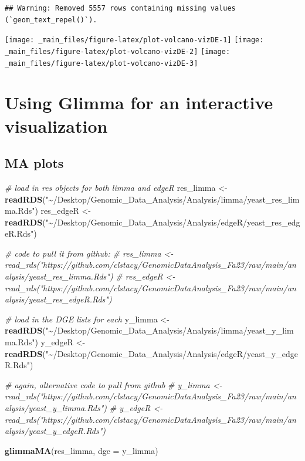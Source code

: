 \documentclass[
]{book}
\newenvironment{Shaded}{\begin{snugshade}}{\end{snugshade}}
\newcommand{\AttributeTok}[1]{\textcolor[rgb]{0.13,0.29,0.53}{#1}}
\newcommand{\CommentTok}[1]{\textcolor[rgb]{0.56,0.35,0.01}{\textit{#1}}}
\newcommand{\FunctionTok}[1]{\textcolor[rgb]{0.13,0.29,0.53}{\textbf{#1}}}
\newcommand{\NormalTok}[1]{#1}
\newcommand{\OtherTok}[1]{\textcolor[rgb]{0.56,0.35,0.01}{#1}}
\newcommand{\StringTok}[1]{\textcolor[rgb]{0.31,0.60,0.02}{#1}}
\begin{document}
\begin{verbatim}
## Warning: Removed 5557 rows containing missing values (`geom_text_repel()`).
\end{verbatim}

\texttt{[image: \_main\_files/figure-latex/plot-volcano-vizDE-1]} \texttt{[image: \_main\_files/figure-latex/plot-volcano-vizDE-2]} \texttt{[image: \_main\_files/figure-latex/plot-volcano-vizDE-3]}

\hypertarget{using-glimma-for-an-interactive-visualization}{%
\section{Using Glimma for an interactive visualization}\label{using-glimma-for-an-interactive-visualization}}

\hypertarget{ma-plots}{%
\subsection{MA plots}\label{ma-plots}}

\begin{Shaded}
\begin{Highlighting}[]
\CommentTok{\# load in res objects for both limma and edgeR}
\NormalTok{res\_limma }\OtherTok{\textless{}{-}} \FunctionTok{readRDS}\NormalTok{(}\StringTok{"\textasciitilde{}/Desktop/Genomic\_Data\_Analysis/Analysis/limma/yeast\_res\_limma.Rds"}\NormalTok{)}
\NormalTok{res\_edgeR }\OtherTok{\textless{}{-}} \FunctionTok{readRDS}\NormalTok{(}\StringTok{"\textasciitilde{}/Desktop/Genomic\_Data\_Analysis/Analysis/edgeR/yeast\_res\_edgeR.Rds"}\NormalTok{)}

\CommentTok{\# code to pull it from github:}
\CommentTok{\# res\_limma \textless{}{-} read\_rds("https://github.com/clstacy/GenomicDataAnalysis\_Fa23/raw/main/analysis/yeast\_res\_limma.Rds")}
\CommentTok{\# res\_edgeR \textless{}{-} read\_rds("https://github.com/clstacy/GenomicDataAnalysis\_Fa23/raw/main/analysis/yeast\_res\_edgeR.Rds")}


\CommentTok{\# load in the DGE lists for each}
\NormalTok{y\_limma }\OtherTok{\textless{}{-}} \FunctionTok{readRDS}\NormalTok{(}\StringTok{"\textasciitilde{}/Desktop/Genomic\_Data\_Analysis/Analysis/limma/yeast\_y\_limma.Rds"}\NormalTok{)}
\NormalTok{y\_edgeR }\OtherTok{\textless{}{-}} \FunctionTok{readRDS}\NormalTok{(}\StringTok{"\textasciitilde{}/Desktop/Genomic\_Data\_Analysis/Analysis/edgeR/yeast\_y\_edgeR.Rds"}\NormalTok{)}

\CommentTok{\# again, alternative code to pull from github}
\CommentTok{\# y\_limma \textless{}{-} read\_rds("https://github.com/clstacy/GenomicDataAnalysis\_Fa23/raw/main/analysis/yeast\_y\_limma.Rds")}
\CommentTok{\# y\_edgeR \textless{}{-} read\_rds("https://github.com/clstacy/GenomicDataAnalysis\_Fa23/raw/main/analysis/yeast\_y\_edgeR.Rds")}

\FunctionTok{glimmaMA}\NormalTok{(res\_limma, }\AttributeTok{dge =}\NormalTok{ y\_limma)}
\end{Highlighting}
\end{Shaded}
\end{document}
